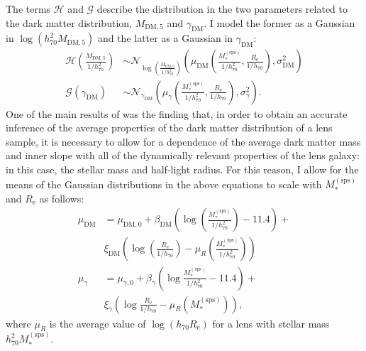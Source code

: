 \documentclass{aa}
\def\hseventy{h_{70}}
\def\msps{M_*^{\mathrm{(sps)}}}
\def\mfive{M_{\mathrm{DM},5}}
\def\gammadm{\gamma_{\mathrm{DM}}}
\def\reff{R_{\mathrm{e}}}
\begin{document}
The terms $\mathcal{H}$ and $\mathcal{G}$ describe the distribution in the two parameters related to the dark matter distribution, $\mfive$ and $\gammadm$.
I model the former as a Gaussian in $\log{(\hseventy^2\mfive)}$ and the latter as a Gaussian in $\gammadm$:
\begin{align}
\mathcal{H}\left(\frac{\mfive}{1/\hseventy^2}\right) & \sim \mathcal{N}_{\log{(\frac{\mfive}{1/\hseventy^2})}}\left(\mu_{\mathrm{DM}}\left(\frac{\msps}{1/\hseventy^2},\frac{\reff}{1/\hseventy}\right), \sigma_{\mathrm{DM}}^2\right)\label{eq:hterm} \\
\mathcal{G}\left(\gammadm\right) & \sim \mathcal{N}_{\gammadm}\left(\mu_\gamma\left(\frac{\msps}{1/\hseventy^2},\frac{\reff}{1/\hseventy}\right), \sigma_\gamma^2\right)\label{eq:gterm}.
\end{align}
One of the main results of  was the finding that, in order to obtain an accurate inference of the average properties of the dark matter distribution of a lens sample, it is necessary to allow for a dependence of the average dark matter mass and inner slope with all of the dynamically relevant properties of the lens galaxy: in this case, the stellar mass and half-light radius.
For this reason, I allow for the means of the Gaussian distributions in the above equations to scale with $\msps$ and $\reff$ as follows:
\begin{align}
\mu_{\mathrm{DM}} & = \mu_{\mathrm{DM},0} + \beta_{\mathrm{DM}}\left(\log{\left(\frac{\msps}{1/\hseventy^2}\right)} - 11.4\right) + \nonumber \\
& \xi_{\mathrm{DM}}\left(\log{\left(\frac{\reff}{1/\hseventy}\right)} - \mu_R\left(\frac{\msps}{1/\hseventy^2}\right)\right)\label{eq:muh} \\
\mu_\gamma & = \mu_{\gamma,0} + \beta_\gamma(\log{\frac{\msps}{1/\hseventy^2}} - 11.4) + \nonumber \\
& \xi_\gamma(\log{\frac{\reff}{1/\hseventy}} - \mu_R(\msps)),\label{eq:mug}
\end{align}
where $\mu_R$ is the average value of $\log{(\hseventy\reff)}$ for a lens with stellar mass $\hseventy^2\msps$.
\end{document}
